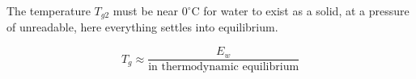 The temperature \( T_{g2} \) must be near \( 0^\circ \text{C} \) for water to exist as a solid, at a pressure of unreadable, here everything settles into equilibrium.

\[
T_{g} \approx \frac{E_w}{\text{in thermodynamic equilibrium}}
\]